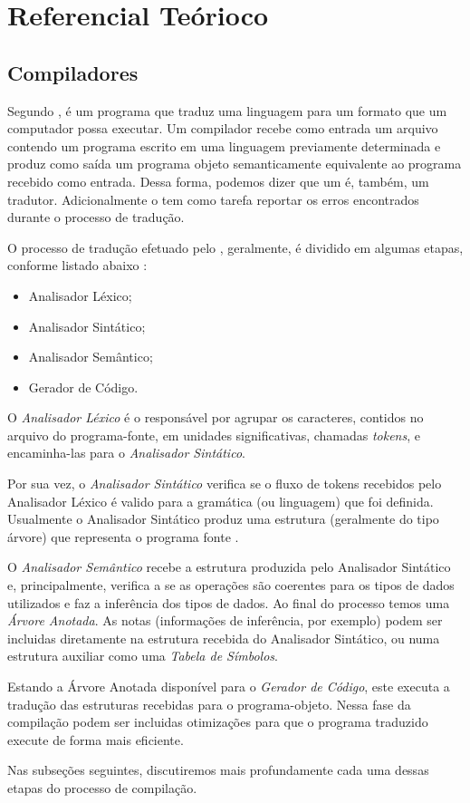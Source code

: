 \section{Referencial Teórioco}
\subsection{Compiladores}
Segundo , \compilador é um programa que traduz uma
linguagem para um formato que um computador possa executar. Um compilador recebe
como entrada um arquivo contendo um programa escrito em uma linguagem previamente
determinada e produz como saída um programa objeto semanticamente equivalente
ao programa recebido como entrada. Dessa forma, podemos dizer que um \compilador é,
também, um tradutor. Adicionalmente o \compilador tem como tarefa reportar os
erros encontrados durante o processo de tradução.

O processo de tradução efetuado pelo \compilador, geralmente, é dividido em
algumas etapas, conforme listado abaixo \cite{louden97-pt}:

\begin{itemize}
	\item Analisador Léxico;
	\item Analisador Sintático;
	\item Analisador Semântico;
	\item Gerador de Código.
\end{itemize}

O \emph{Analisador Léxico} é o responsável por agrupar os caracteres, contidos
no arquivo do programa-fonte, em unidades significativas, chamadas
\emph{tokens}, e encaminha-las para o \emph{Analisador Sintático}.

Por sua vez, o \emph{Analisador Sintático} verifica se o fluxo de tokens
recebidos pelo Analisador Léxico é valido para a gramática (ou linguagem) que
foi definida. Usualmente o Analisador Sintático produz uma estrutura
(geralmente do tipo árvore) que representa o programa fonte
\cite{new-dragon-pt}.

O \emph{Analisador Semântico} recebe a estrutura produzida pelo Analisador
Sintático e, principalmente, verifica a se as operações são coerentes para os
tipos de dados utilizados e faz a inferência dos tipos de dados. Ao final do
processo temos uma \emph{Árvore Anotada}. As notas (informações de inferência,
por exemplo) podem ser incluidas diretamente na estrutura recebida do
Analisador Sintático, ou numa estrutura auxiliar como uma \emph{Tabela de
Símbolos}.

Estando a Árvore Anotada disponível para o \emph{Gerador de Código}, este
executa a tradução das estruturas recebidas para o programa-objeto. Nessa fase
da compilação podem ser incluidas otimizações para que o programa traduzido
execute de forma mais eficiente.

Nas subseções seguintes, discutiremos mais profundamente cada uma dessas etapas
do processo de compilação.





